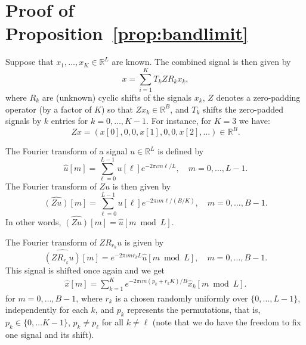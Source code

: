 \documentclass[english,12pt]{article}
\newcommand{\I}{\iota}
\newcommand{\R}{\mathbb{R}}
\newcommand{\TODO}[1]{{\color{red}{[#1]}}}
\numberwithin{equation}{section}
\numberwithin{thm}{section} %
\begin{document}
 \TODO{Relation to 2-D Kam's method?}
	




\appendix

\section{Proof of Proposition~\ref{prop:bandlimit}} \label{sec:proof_bandlimit}
Suppose that $x_1,\ldots,x_K\in\R^L$ are known.
The combined signal is then given by 
\begin{equation}
x = \sum_{i=1}^K T_kZR_kx_k,
\end{equation}
where $R_k$ are (unknown) cyclic shifts of the signals $x_k$, $Z$ denotes a zero-padding operator (by a factor of $K$) so that $Zx_k\in\mathbb{R}^B$, and $T_k$ shifts the zero-padded signals by $k$ entries for $k=0,\ldots, K-1$. 
For instance, for $K=3$ we have: 
\begin{equation}
Zx = (x[0],0,0,x[1],0,0,x[2],...)\in\mathbb{R}^B.
\end{equation}

The Fourier transform of a signal $u\in\mathbb{R}^{L}$ is defined by 
\begin{equation}
\hat{u}[m]=\sum_{\ell=0}^{L-1}u[\ell]e^{-2\pi\I m\ell /L}, \quad m=0,\ldots,L-1. 
\end{equation}
The Fourier transform of $Zu$ is then given by 
\begin{equation}
\widehat{(Zu)}[m] = \sum_{\ell=0}^{L-1}u[\ell]e^{-2\pi\I m\ell /(B/K)}, \quad m=0,\ldots,B-1.
\end{equation}
In other words, $\widehat{(Zu)}[m] = \hat{u}[m\bmod L]$.


The Fourier transform of $ZR_{r_k}u$ is  given by 
\begin{equation}
\widehat{(ZR_{r_k}u)}[m] = e^{-2\pi\I m r_k L} \hat{u}[m\bmod L], \quad m=0,\ldots,B-1.
\end{equation}
This signal is shifted once again and we get
\begin{eqnarray} \label{eq:Fourier_structure}
\hat{x}[m] = \sum_{k=1}^K e^{-2\pi\I m( p_k+r_k K)/B} \hat{x}_k[m \bmod L]. 
\end{eqnarray}
for $m=0,\ldots,B-1$, 
where $r_k$ is a chosen randomly uniformly over $\{0,\ldots,L-1\}$, independently for each $k$, and $p_k$ represents the permutations, that is, $p_k\in\{0,\ldots K-1\}$, $p_k\neq p_\ell$ for all $k\neq \ell$ (note that we do have the freedom to fix one signal and its shift). 
\end{document}
